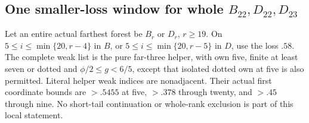 \subsection{One smaller-loss window for whole $B_{22},D_{22},D_{23}$}
\label{app:tail:whole58}
\begin{lemma}
\label{app:tail:lem:whole58local}
Let an entire actual farthest forest be $B_r$ or $D_r$, $r\ge19$.
On $5\le i\le\min\{20,r-4\}$ in $B$, or
$5\le i\le\min\{20,r-5\}$ in $D$, use the loss $.58$.
The complete weak list is the pure far-three helper, with own five,
finite at least seven or dotted and $\phi/2\le g<6/5$, except
that isolated dotted own at five is also permitted.
Literal helper weak indices are nonadjacent. Their actual first
coordinate bounds are $>.5455$ at five, $>.378$ through twenty,
and $>.45$ through nine. No short-tail continuation or whole-rank
exclusion is part of this local statement.
\end{lemma}
